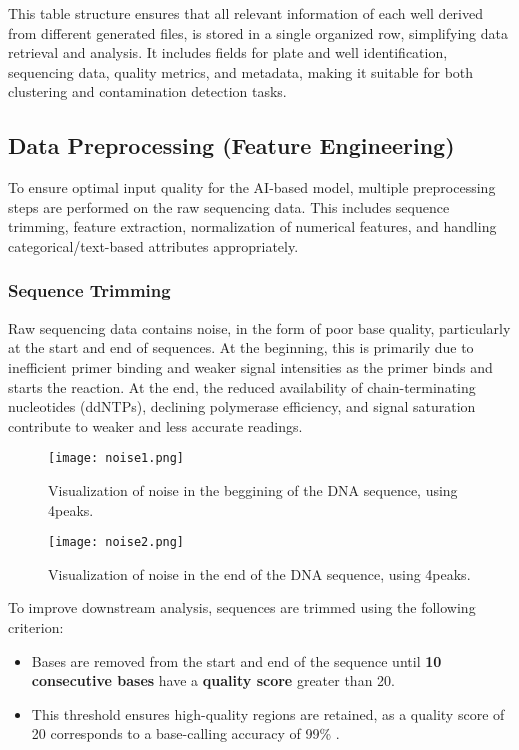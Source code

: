 This table structure ensures that all relevant information of each well derived from different generated files, is stored in a single organized row, simplifying data retrieval and analysis. It includes fields for plate and well identification, sequencing data, quality metrics, and metadata, making it suitable for both clustering and contamination detection tasks.


\subsection{Data Preprocessing (Feature Engineering)}

To ensure optimal input quality for the AI-based model, multiple preprocessing steps are performed on the raw sequencing data. This includes sequence trimming, feature extraction, normalization of numerical features, and handling categorical/text-based attributes appropriately.

\subsubsection{Sequence Trimming}
Raw sequencing data contains noise, in the form of poor base quality, particularly at the start and end of sequences. At the beginning, this is primarily due to inefficient primer binding and weaker signal intensities as the primer binds and starts the reaction. At the end, the reduced availability of chain-terminating nucleotides (ddNTPs), declining polymerase efficiency, and signal saturation contribute to weaker and less accurate readings. \cite{sanger_method_original}

\begin{figure}[h]
  \centering
  \texttt{[image: noise1.png]}
  \caption{Visualization of noise in the beggining of the DNA sequence, using 4peaks.}
  \label{fig:noise1}
\end{figure}

\begin{figure}[h]
  \centering
  \texttt{[image: noise2.png]}
  \caption{Visualization of noise in the end of the DNA sequence, using 4peaks.}
  \label{fig:noise2}
\end{figure}

To improve downstream analysis, sequences are trimmed using the following criterion:

\begin{itemize}
    \item Bases are removed from the start and end of the sequence until \textbf{10 consecutive bases} have a \textbf{quality score} greater than 20.
    \item This threshold ensures high-quality regions are retained, as a quality score of 20 corresponds to a base-calling accuracy of 99\% \cite{quality_score_threshold}.
\end{itemize}

